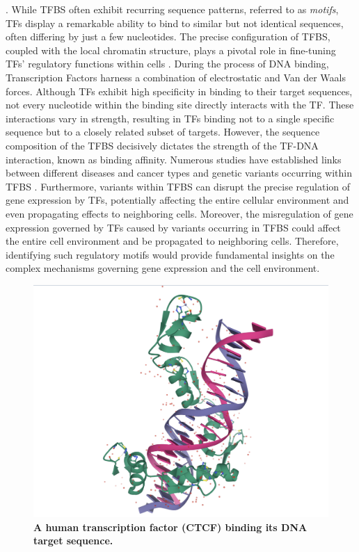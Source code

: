 \documentclass[a4paper, titlepage, openright]{book}
\begin{document}
\citep{gotea2010homotypic,lemon2000orchestrated,nolis2009transcription}.  While TFBS often exhibit recurring sequence patterns, referred to as \emph{motifs}, TFs display a remarkable ability to bind to similar but not identical sequences, often differing by just a few nucleotides. The precise configuration of TFBS, coupled with the local chromatin structure, plays a pivotal role in fine-tuning TFs' regulatory functions within cells \citep{mendenhall2013locus,maurano2015large}. During the process of DNA binding, Transcription Factors harness a combination of electrostatic and Van der Waals forces. Although TFs exhibit high specificity in binding to their target sequences, not every nucleotide within the binding site directly interacts with the TF. These interactions vary in strength, resulting in TFs binding not to a single specific sequence but to a closely related subset of targets. However, the sequence composition of the TFBS decisively dictates the strength of the TF-DNA interaction, known as binding affinity. Numerous studies have established links between different diseases and cancer types and genetic variants occurring within TFBS \citep{docquier2005heightened, katainen2015ctcf, yu2019gata1}. Furthermore, variants within TFBS can disrupt the precise regulation of gene expression by TFs, potentially affecting the entire cellular environment and even propagating effects to neighboring cells. Moreover, the misregulation of gene expression governed by TFs caused by variants occurring in TFBS could affect the entire cell environment and be propagated to neighboring cells. Therefore, identifying such regulatory motifs would provide fundamental insights on the complex mechanisms governing gene expression and the cell environment.
\begin{figure}
	\centering
	\includegraphics[width=\textwidth]{figures/ctcf_dna.png}
	\caption[A human transcription factor (CTCF) binding its DNA target sequence.]{\textbf{A human transcription factor (CTCF) binding its DNA target sequence.}}
	\label{fig:ctcf_dna}
\end{figure}
\end{document}
